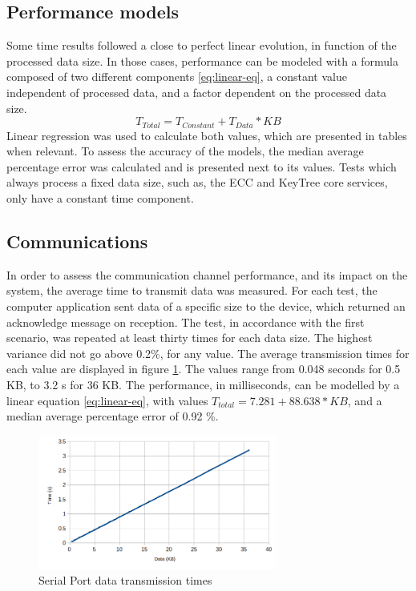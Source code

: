 \subsection{Performance models}\label{chap:evaluation:performance:models}

Some time results followed a close to perfect linear evolution, in function of the processed data size. In those cases, performance can be modeled with a formula composed of two different components \ref{eq:linear-eq}, a constant value independent of processed data, and a factor dependent on the processed data size.
\begin{equation}
	\label{eq:linear-eq}
	T_{Total} = T_{Constant} + T_{Data} * KB
\end{equation}
Linear regression was used to calculate both values, which are presented in tables when relevant. To assess the accuracy of the models, the median average percentage error was calculated and is presented next to its values. Tests which always process a fixed data size, such as, the ECC and KeyTree core services, only have a constant time component.

\subsection{Communications}\label{chap:evaluation:performance:comms}

In order to assess the communication channel performance, and its impact on the system, the average time to transmit data was measured. For each test, the computer application sent data of a specific size to the device, which returned an acknowledge message on reception. The test, in accordance with the first scenario, was repeated at least thirty times for each data size. The highest variance did not go above 0.2\%, for any value.
The average transmission times for each value are displayed in figure \ref{fig:comms:time}.
The values range from 0.048 seconds for 0.5 KB, to 3.2 s for 36 KB.
The performance, in milliseconds, can be modelled by a linear equation \ref{eq:linear-eq}, with values \(T_{total} = 7.281 + 88.638 * KB\), and a median average percentage error of 0.92 \%.

\begin{figure}[h!]
	\centering
	\includegraphics[width=0.7\textwidth]{./Images/comms-time.png}
	\caption{Serial Port data transmission times}
	\label{fig:comms:time}
\end{figure}


